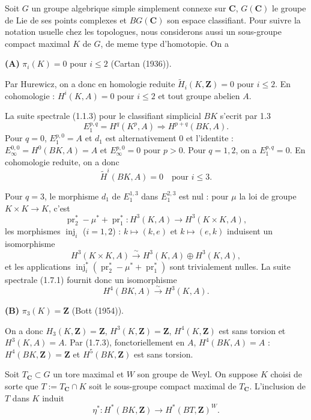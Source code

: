 \documentclass[11pt,a4paper]{article}
\theoremstyle{plain}
\theoremstyle{definition}
\DeclareMathOperator{\pr}{pr}
\DeclareMathOperator{\inj}{inj}
\begin{document}
Soit $G$ un groupe algebrique simple simplement connexe sur $\mathbf{C}$, $G(\mathbf{C})$ le groupe de Lie de ses points complexes et $BG(\mathbf{C})$ son espace classifiant. Pour suivre la notation usuelle chez les topologues, nous considerons aussi un sous-groupe compact maximal $K$ de $G$, de meme type d'homotopie. On a

\textbf{(A)} $\pi_i(K) = 0$ pour $i \leq 2$ (Cartan (1936)).

Par Hurewicz, on a donc en homologie reduite $\widetilde{H}_i(K, \mathbf{Z}) = 0$ pour $i \leq 2$. En cohomologie : $H^i(K, A) = 0$ pour $i \leq 2$ et tout groupe abelien $A$.

La suite spectrale (1.1.3) pour le classifiant simplicial $BK$ s'ecrit par 1.3
\begin{equation}\label{1.7.1}
E_1^{p,q} = H^q(K^p, A) \Rightarrow H^{p+q}(BK, A).
\end{equation}
Pour $q = 0$, $E_1^{p,0} = A$ et $d_1$ est alternativement 0 et l'identite : $E_\infty^{0,0} = H^0(BK, A) = A$ et $E_\infty^{p,0} = 0$ pour $p > 0$. Pour $q = 1, 2$, on a $E_1^{p,q} = 0$. En cohomologie reduite, on a donc
\begin{equation}\label{1.7.2}
\widetilde{H}^i(BK, A) = 0 \quad \text{pour } i \leq 3.
\end{equation}

Pour $q = 3$, le morphisme $d_1$ de $E_1^{1,3}$ dans $E_1^{2,3}$ est nul : pour $\mu$ la loi de groupe $K \times K \to K$, c'est
\[
\pr_2^* - \mu^* + \pr_1^* : H^3(K, A) \to H^3(K \times K, A),
\]
les morphismes $\inj_i$ ($i = 1, 2$) : $k \mapsto (k,e)$ et $k \mapsto (e,k)$ induisent un isomorphisme
\[
H^3(K \times K, A) \xrightarrow{\sim} H^3(K, A) \oplus H^3(K, A),
\]
et les applications $\inj_i^*(\pr_2^* - \mu^* + \pr_1^*)$ sont trivialement nulles. La suite spectrale (1.7.1) fournit donc un isomorphisme
\begin{equation}\label{1.7.3}
H^4(BK, A) \xrightarrow{\sim} H^3(K, A).
\end{equation}

\textbf{(B)} $\pi_3(K) = \mathbf{Z}$ (Bott (1954)).

On a donc $H_3(K, \mathbf{Z}) = \mathbf{Z}$, $H^3(K, \mathbf{Z}) = \mathbf{Z}$, $H^4(K, \mathbf{Z})$ est sans torsion et $H^3(K, A) = A$. Par (1.7.3), fonctoriellement en $A$, $H^4(BK, A) = A$ : $H^4(BK, \mathbf{Z}) = \mathbf{Z}$ et $H^5(BK, \mathbf{Z})$ est sans torsion.

Soit $T_\mathbf{C} \subset G$ un tore maximal et $W$ son groupe de Weyl. On suppose $K$ choisi de sorte que $T := T_\mathbf{C} \cap K$ soit le sous-groupe compact maximal de $T_\mathbf{C}$. L'inclusion de $T$ dans $K$ induit
\begin{equation}\label{1.7.4}
\eta^* : H^*(BK, \mathbf{Z}) \to H^*(BT, \mathbf{Z})^W.
\end{equation}
\end{document}
